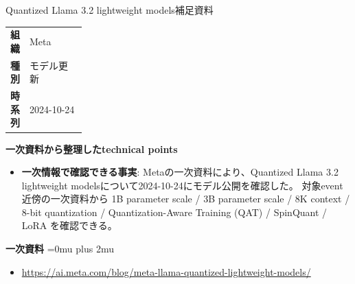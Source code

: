 \begin{technicalnote}{Quantized Llama 3.2 lightweight models}{補足資料}
\begingroup
\begin{tabularx}{\linewidth}{@{}>{\bfseries}p{0.22\linewidth}X@{}}
組織 & Meta \\
種別 & モデル更新 \\
時系列 & 2024-10-24 \\
\end{tabularx}
\smallskip
{\bfseries 一次資料から整理したtechnical points}
\begin{itemize}[leftmargin=1.5em,itemsep=0.35em]
\item \textbf{一次情報で確認できる事実}: Metaの一次資料により、Quantized Llama 3.2 lightweight modelsについて2024-10-24にモデル公開を確認した。 対象event近傍の一次資料から 1B parameter scale / 3B parameter scale / 8K context / 8-bit quantization / Quantization-Aware Training (QAT) / SpinQuant / LoRA を確認できる。
\end{itemize}
\begin{minipage}{\linewidth}
\begin{samepage}
{\bfseries 一次資料}
\begingroup\sloppy
\Urlmuskip=0mu plus 2mu\relax
\begin{itemize}[leftmargin=1.5em,itemsep=0.25em]
\item {\scriptsize\url{https://ai.meta.com/blog/meta-llama-quantized-lightweight-models/}}
\end{itemize}
\endgroup
\end{samepage}
\end{minipage}
\endgroup
\end{technicalnote}
\medskip
